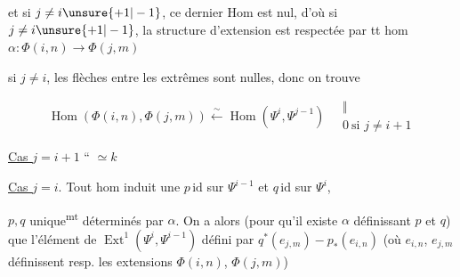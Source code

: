 et si $j\ne i\unsure{+1|-1}$, ce dernier Hom est nul, d'où si $j\ne i\unsure{+1|-1}$, la structure d'extension est respectée par tt hom $\alpha:\Phi(i,n)\longrightarrow\Phi(j,m)$


si  $j\ne i$, les flèches entre les extrêmes sont nulles, donc on trouve

\[\operatorname{Hom}(\Phi(i,n),\Phi(j,m))\xleftarrow{\sim}\operatorname{Hom}(\Psi^i,\Psi^{j-1})\quad\begin{matrix}\Vert\\0\ \text{si }j\ne i+1\end{matrix}\]

\uline{Cas $j=i+1$} \quad \textquotedblleft\quad \unsure{\textquotedblright} $\simeq k$

\uline{Cas $j=i$}. Tout hom induit une $p\,\mathrm{id}$ sur $\Psi^{i-1}$ et $q\,\mathrm{id}$ sur $\Psi^{i}$,


$p,q$ unique\textsuperscript{mt} déterminés par $\alpha$. On a alors (pour qu'il existe $\alpha$ définissant $p$ et $q$) que l'élément de $\operatorname{Ext}^1(\Psi^i,\Psi^{i-1})$ défini par $q^*(e_{j,m})-p_*(e_{i,n})$ (où $e_{i,n}$, $e_{j,m}$ définissent resp. les extensions $\Phi(i,n)$, $\Phi(j,m)$)


